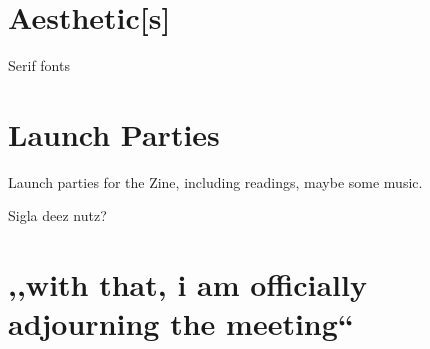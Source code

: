 \section{Aesthetic[s]}
	Serif fonts
\section{Launch Parties}
	Launch parties for the Zine, including readings, maybe some music.

	Sigla deez nutz?

\section{,,with that, i am officially adjourning the meeting``}
